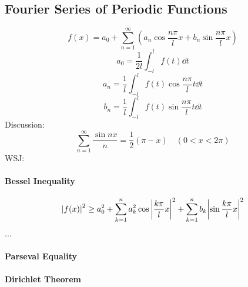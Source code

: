 \documentclass[UTF8]{ctexart} %
\numberwithin{equation}{section}
\begin{document}
\subsection{Fourier Series of Periodic Functions}
\begin{equation}\label{key}
f(x)=a_0+\sum_{n=1}^\infty(a_n\cos \dfrac{n\pi}{l}x+b_n\sin \dfrac{n\pi}{l}x)
\end{equation}
\begin{equation}\label{key}
a_0=\dfrac{1}{2l}\int_{-l}^{l}f(t)\dd{t}
\end{equation}
\begin{equation}\label{key}
a_n=\dfrac{1}{l}\int_{-l}^{l}f(t)\cos\dfrac{n\pi}{l}t\dd t
\end{equation}
\begin{equation}\label{key}
b_n=\dfrac{1}{l}\int_{-l}^{l}f(t)\sin\dfrac{n\pi}{l}t\dd t
\end{equation}
Discussion:
\begin{equation}\label{key}
\sum_{n=1}^\infty\dfrac{\sin nx}{n}=\dfrac{1}{2}(\pi-x)\quad(0<x<2\pi)
\end{equation}
WSJ:\\
\paragraph{Bessel Inequality}
\begin{equation}\label{key}
\abs{f(x)}^2 \geq a_0^2 + \sum_{k=1}^n a_k^2\cos \abs{\dfrac{k\pi}{l}x}^2 + \sum_{k=1}^n b_k\abs{\sin \dfrac{k\pi}{l}x}^2
\end{equation}
...
\paragraph{Parseval Equality}
\paragraph{Dirichlet Theorem}
\end{document}
